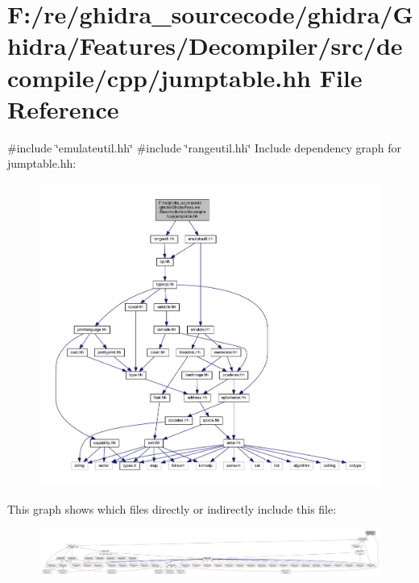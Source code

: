 \hypertarget{jumptable_8hh}{}\section{F\+:/re/ghidra\+\_\+sourcecode/ghidra/\+Ghidra/\+Features/\+Decompiler/src/decompile/cpp/jumptable.hh File Reference}
\label{jumptable_8hh}
{\ttfamily \#include \char`\"{}emulateutil.\+hh\char`\"{}}\newline
{\ttfamily \#include \char`\"{}rangeutil.\+hh\char`\"{}}\newline
Include dependency graph for jumptable.\+hh\+:
\nopagebreak
\begin{figure}[H]
\begin{center}
\leavevmode
\includegraphics[width=350pt]{jumptable_8hh__incl}
\end{center}
\end{figure}
This graph shows which files directly or indirectly include this file\+:
\nopagebreak
\begin{figure}[H]
\begin{center}
\leavevmode
\includegraphics[width=350pt]{jumptable_8hh__dep__incl}
\end{center}
\end{figure}
